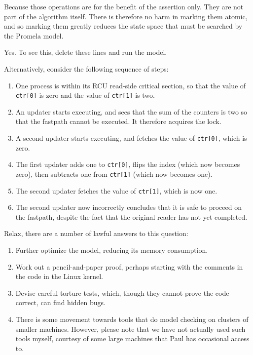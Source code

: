 Because those operations are for the benefit of the
assertion only.  They are not part of the algorithm itself.
There is therefore no harm in marking them atomic, and
so marking them greatly reduces the state space that must
be searched by the Promela model.


Yes.  To see this, delete these lines and run the model.

Alternatively, consider the following sequence of steps:

\begin{enumerate}
\item	One process is within its RCU read-side critical
	section, so that the value of {\tt ctr[0]} is zero and
	the value of {\tt ctr[1]} is two.
\item	An updater starts executing, and sees that the sum of
	the counters is two so that the fastpath cannot be
	executed.  It therefore acquires the lock.
\item	A second updater starts executing, and fetches the value
	of {\tt ctr[0]}, which is zero.
\item	The first updater adds one to {\tt ctr[0]}, flips
	the index (which now becomes zero), then subtracts
	one from {\tt ctr[1]} (which now becomes one).
\item	The second updater fetches the value of {\tt ctr[1]},
	which is now one.
\item	The second updater now incorrectly concludes that it
	is safe to proceed on the fastpath, despite the fact
	that the original reader has not yet completed.
\end{enumerate}


	Relax, there are a number of lawful answers to
	this question:
	\begin{enumerate}
	\item	Further optimize the model, reducing its memory consumption.
	\item	Work out a pencil-and-paper proof, perhaps starting with the
		comments in the code in the Linux kernel.
	\item	Devise careful torture tests, which, though they cannot prove
		the code correct, can find hidden bugs.
	\item	There is some movement towards tools that do model
		checking on clusters of smaller machines.
		However, please note that we have not actually used such
		tools myself, courtesy of some large machines that Paul has
		occasional access to.
	\end{enumerate}

